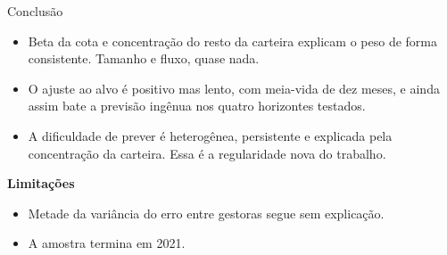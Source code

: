 \documentclass[aspectratio=169,11pt]{beamer}
\begin{document}
\begin{frame}{Conclusão}

\begin{itemize}
  \item Beta da cota e concentração do resto da carteira explicam o peso de forma
        consistente. Tamanho e fluxo, quase nada.
  \item O ajuste ao alvo é positivo mas lento, com meia-vida de dez meses, e ainda assim
        bate a previsão ingênua nos quatro horizontes testados.
  \item A dificuldade de prever é heterogênea, persistente e explicada pela concentração
        da carteira. Essa é a regularidade nova do trabalho.
\end{itemize}

\vspace{0.9em}
\textbf{Limitações}

\begin{itemize}
  \item Metade da variância do erro entre gestoras segue sem explicação.
  \item A amostra termina em 2021.
\end{itemize}

\end{frame}
\end{document}
